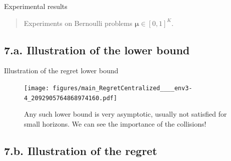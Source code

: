 \documentclass[12pt,english,ignorenonframetext,aspectratio=169,]{beamer}
\providecommand{\tightlist}{%
  \setlength{\itemsep}{0pt}\setlength{\parskip}{0pt}}
\begin{document}
\begin{frame}{Experimental results}

\begin{quote}
Experiments on Bernoulli problems \(\boldsymbol{\mu}\in[0,1]^K\).
\end{quote}


\end{frame}


\subsection{\hfill{}7.a. Illustration of the lower bound\hfill{}}

\begin{frame}[plain]{Illustration of the regret lower bound}

\begin{figure}[h!]
\texttt{[image: figures/main\_RegretCentralized\_\_\_\_env3-4\_2092905764868974160.pdf]}
\caption{\footnotesize{Any such lower bound is \alert{very asymptotic}, usually not satisfied for small horizons. We can see the importance of the collisions!}}
\end{figure}

\end{frame}



\subsection{\hfill{}7.b. Illustration of the regret\hfill{}}
\end{document}
